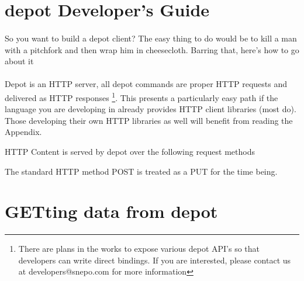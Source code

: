 \documentclass{article}
\begin{document}
\section{depot Developer's Guide}

\paragraph{}
So you want to build a depot client? The easy thing to do would be to
kill a man with a pitchfork and then wrap him in cheesecloth. Barring
that, here's how to go about it

\paragraph{}
Depot is an HTTP server, all depot commands are proper HTTP requests
and delivered as HTTP responses \footnote{There are plans in the works
  to expose various depot API's so that developers can write direct
  bindings. If you are interested, please contact us at
  developers@snepo.com for more information}. This presents a
particularly easy path if the language you are developing in already
provides HTTP client libraries (most do). Those developing their
own HTTP libraries as well will benefit from reading the Appendix. %

HTTP Content is served by depot over the following request methods


The standard HTTP method POST is treated as a PUT for the time being. 

\section{GETting data from depot}
\paragraph{}
\end{document}
